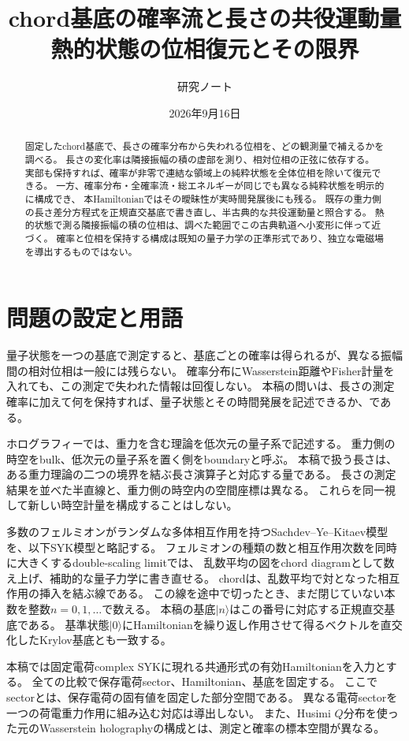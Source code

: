 \documentclass[a4paper,11pt]{ltjsarticle}
\title{chord基底の確率流と長さの共役運動量\\熱的状態の位相復元とその限界}
\author{研究ノート}
\date{2026年9月16日}
\numberwithin{equation}{section}
\newcommand{\ket}[1]{\lvert #1\rangle}
\begin{document}
\maketitle
\begin{abstract}
固定したchord基底で、長さの確率分布から失われる位相を、どの観測量で補えるかを調べる。
長さの変化率は隣接振幅の積の虚部を測り、相対位相の正弦に依存する。
実部も保持すれば、確率が非零で連結な領域上の純粋状態を全体位相を除いて復元できる。
一方、確率分布・全確率流・総エネルギーが同じでも異なる純粋状態を明示的に構成でき、
本Hamiltonianではその曖昧性が実時間発展後にも残る。
既存の重力側の長さ差分方程式を正規直交基底で書き直し、半古典的な共役運動量と照合する。
熱的状態で測る隣接振幅の積の位相は、調べた範囲でこの古典軌道へ小変形に伴って近づく。
確率と位相を保持する構成は既知の量子力学の正準形式であり、独立な電磁場を導出するものではない。
\end{abstract}
\setcounter{tocdepth}{1}
\tableofcontents
\clearpage

\section{問題の設定と用語}
量子状態を一つの基底で測定すると、基底ごとの確率は得られるが、異なる振幅間の相対位相は一般には残らない。
確率分布にWasserstein距離やFisher計量を入れても、この測定で失われた情報は回復しない。
本稿の問いは、長さの測定確率に加えて何を保持すれば、量子状態とその時間発展を記述できるか、である。

ホログラフィーでは、重力を含む理論を低次元の量子系で記述する。
重力側の時空をbulk、低次元の量子系を置く側をboundaryと呼ぶ。
本稿で扱う長さは、ある重力理論の二つの境界を結ぶ長さ演算子と対応する量である。
長さの測定結果を並べた半直線と、重力側の時空内の空間座標は異なる。
これらを同一視して新しい時空計量を構成することはしない。

多数のフェルミオンがランダムな多体相互作用を持つSachdev--Ye--Kitaev模型を、以下SYK模型と略記する。
フェルミオンの種類の数と相互作用次数を同時に大きくするdouble-scaling limitでは、
乱数平均の図をchord diagramとして数え上げ、補助的な量子力学に書き直せる。
chordは、乱数平均で対となった相互作用の挿入を結ぶ線である。
この線を途中で切ったとき、まだ閉じていない本数を整数$n=0,1,\ldots$で数える。
本稿の基底$\ket n$はこの番号に対応する正規直交基底である。
基準状態$\ket0$にHamiltonianを繰り返し作用させて得るベクトルを直交化したKrylov基底とも一致する\cite{Heller}。

本稿では固定電荷complex SYKに現れる共通形式の有効Hamiltonianを入力とする\cite{Forste}。
全ての比較で保存電荷sector、Hamiltonian、基底を固定する。
ここでsectorとは、保存電荷の固有値を固定した部分空間である。
異なる電荷sectorを一つの荷電重力作用に組み込む対応は導出しない。
また、Husimi $Q$分布を使った元のWasserstein holographyの構成とは、測定と確率の標本空間が異なる\cite{HashimotoTanahashi}。
\end{document}
